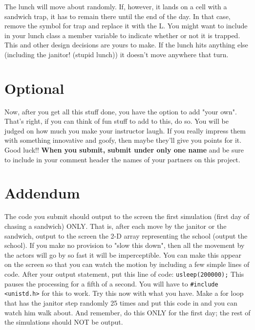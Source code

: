 \documentclass[
    subject = {{Comp Sci}},
    course = {{1570}},
    section = {{101}},
    assignment = {{Assignment 10 \\ Final Project}},
    name = {{Student One ; Student Two}},
    email = {{stosid@mst.edu ; sttsid@mst.edu}}
]{eey-homework}
\begin{document}
The lunch will move about randomly.
If, however, it lands on a cell with a sandwich trap, it has to remain there until the end of the day.
In that case, remove the symbol for trap and replace it with the L.
You might want to include in your lunch class a member variable to indicate whether or not it is trapped.
This and other design decisions are yours to make.
If the lunch hits anything else (including the janitor! (stupid lunch)) it doesn't move anywhere that turn.

\section{Optional}
Now, after you get all this stuff done, you have the option to add "your own".
That's right, if you can think of fun stuff to add to this, do so.
You will be judged on how much you make your instructor laugh.
If you really impress them with something innovative and goofy, then maybe they'll give you points for it.
Good luck!!\hfill\break
\textbf{When you submit, submit under only one name} and be sure to include in your comment header the names of your partners on this project.

\section{Addendum}
The code you submit should output to the screen the first simulation (first day of chasing a sandwich) ONLY.
That is, after each move by the janitor or the sandwich, output to the screen the 2-D array representing the school (output the school).
If you make no provision to "slow this down", then all the movement by the actors will go by so fast it will be imperceptible.
You can make this appear on the screen so that you can watch the motion by including a few simple lines of code.
After your output statement, put this line of code: \verb|usleep(200000);| This pauses the processing for a fifth of a second.
You will have to \verb|#include <unistd.h>| for this to work.
Try this now with what you have.
Make a for loop that has the janitor step randomly 25 times and put this code in and you can watch him walk about.
And remember, do this ONLY for the first day; the rest of the simulations should NOT be output.
\end{document}
